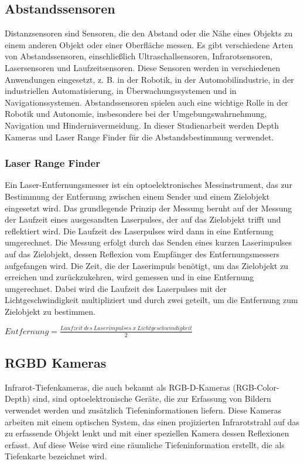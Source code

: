     \subsection{Abstandssensoren} \label{abstandssensoren:subsection}

    Distanzsensoren sind Sensoren, die den Abstand oder die Nähe eines Objekts zu einem anderen Objekt oder einer Oberfläche messen. Es gibt verschiedene Arten von Abstandssensoren, einschließlich Ultraschallsensoren, Infrarotsensoren, Lasersensoren und Laufzeitsensoren. Diese Sensoren werden in verschiedenen Anwendungen eingesetzt, z. B. in der Robotik, in der Automobilindustrie, in der industriellen Automatisierung, in Überwachungssystemen und in Navigationssystemen. Abstandssensoren spielen auch eine wichtige Rolle in der Robotik und Autonomie, insbesondere bei der Umgebungswahrnehmung, Navigation und Hindernisvermeidung. In dieser Studienarbeit werden Depth Kameras und Laser Range Finder für die Abstandsbestimmung verwendet.


    \subsubsection{Laser Range Finder}
    Ein Laser-Entfernungsmesser ist ein optoelektronisches Messinstrument, das zur Bestimmung der Entfernung zwischen einem Sender und einem Zielobjekt eingesetzt wird. Das grundlegende Prinzip der Messung beruht auf der Messung der Laufzeit eines ausgesandten Laserpulses, der auf das Zielobjekt trifft und reflektiert wird. Die Laufzeit des Laserpulses wird dann in eine Entfernung umgerechnet.
    Die Messung erfolgt durch das Senden eines kurzen Laserimpulses auf das Zielobjekt, dessen Reflexion vom Empfänger des Entfernungsmessers aufgefangen wird. Die Zeit, die der Laserimpuls benötigt, um das Zielobjekt zu erreichen und zurückzukehren, wird gemessen und in eine Entfernung umgerechnet. Dabei wird die Laufzeit des Laserpulses mit der Lichtgeschwindigkeit multipliziert und durch zwei geteilt, um die Entfernung zum Zielobjekt zu bestimmen.
    \begin{center}
    $Entfernung = \frac{Laufzeit\ des\ Laserimpulses\ x\ Lichtgeschwindigkeit}{2}$
    \end{center}


    \subsection{RGBD Kameras}

    Infrarot-Tiefenkameras, die auch bekannt als RGB-D-Kameras (RGB-Color-Depth) sind, sind optoelektronische Geräte, die zur Erfassung von Bildern verwendet werden und zusätzlich Tiefeninformationen liefern. Diese Kameras arbeiten mit einem optischen System, das einen projizierten Infrarotstrahl auf das zu erfassende Objekt lenkt und mit einer speziellen Kamera dessen Reflexionen erfasst. Auf diese Weise wird eine räumliche Tiefeninformation erstellt, die als Tiefenkarte bezeichnet wird.


